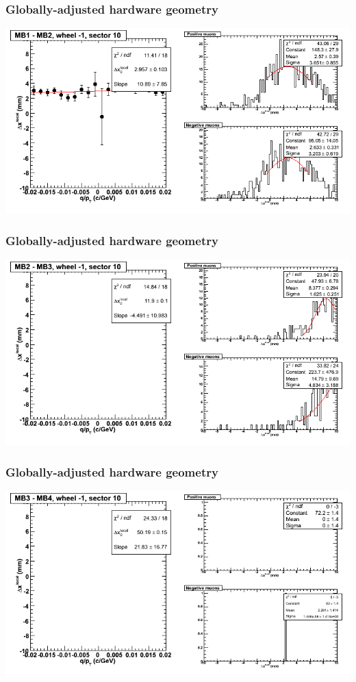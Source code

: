 \documentclass[compress]{beamer}
\begin{document}
\begin{frame}
\frametitle{Globally-adjusted hardware geometry}
\includegraphics[width=\linewidth]{NOV4_segdiffs_HW/dt13_resid_B_10_12.png}
\end{frame}

\begin{frame}
\frametitle{Globally-adjusted hardware geometry}
\includegraphics[width=\linewidth]{NOV4_segdiffs_HW/dt13_resid_B_10_23.png}
\end{frame}

\begin{frame}
\frametitle{Globally-adjusted hardware geometry}
\includegraphics[width=\linewidth]{NOV4_segdiffs_HW/dt13_resid_B_10_34.png}
\end{frame}
\end{document}
